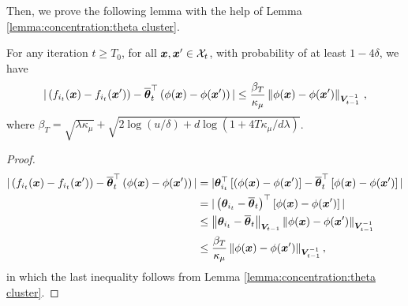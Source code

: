 Then, we prove the following lemma with the help of Lemma \ref{lemma:concentration:theta cluster}.
\begin{lemma}
    \label{lemma:ucb:diff}
For any iteration $t\geq T_0$, for all $\boldsymbol{x},\boldsymbol{x}'\in\mathcal{X}_t$, with probability of at least $1-4\delta$, we have 
\[
|\left(f_{i_t}(\boldsymbol{x}) - f_{i_t}(\boldsymbol{x}')\right) - \overline{\boldsymbol{\theta}}_t^{\top}\left( \phi(\boldsymbol{x}) - \phi(\boldsymbol{x}') \right)| \leq \frac{\beta_T}{\kappa_\mu}\left\| \phi(\boldsymbol{x}) - \phi(\boldsymbol{x}') \right\|_{\boldsymbol{V}_{t-1}^{-1}}\,,
\]
where $\beta_T=\sqrt{\lambda \kappa_\mu}+\sqrt{2\log(u/\delta)+d\log(1+4T\kappa_\mu/d\lambda)}$.
\end{lemma}
\begin{proof}
\begin{equation}
\begin{split}
|\left(f_{i_t}(\boldsymbol{x}) - f_{i_t}(\boldsymbol{x}')\right) - \overline{\boldsymbol{\theta}}_t^{\top}\left( \phi(\boldsymbol{x}) - \phi(\boldsymbol{x}') \right)| &= |\boldsymbol{\theta}_{i_t}^{\top} \left[(\phi(\boldsymbol{x}) - \phi(\boldsymbol{x}')\right] - \overline{\boldsymbol{\theta}}_t^{\top}\left[ \phi(\boldsymbol{x}) - \phi(\boldsymbol{x}') \right]|\\
&= | \left(\boldsymbol{\theta}_{i_t} - \overline{\boldsymbol{\theta}}_t\right)^{\top} \left[\phi(\boldsymbol{x}) - \phi(\boldsymbol{x}') \right]|\\
&\leq \left\| \boldsymbol{\theta}_{i_t} - \overline{\boldsymbol{\theta}}_t \right\|_{\boldsymbol{V}_{t-1}} \left\| \phi(\boldsymbol{x}) - \phi(\boldsymbol{x}') \right\|_{\boldsymbol{V}_{t-1}^{-1}}\\
&\leq \frac{\beta_T}{\kappa_\mu} \left\| \phi(\boldsymbol{x}) - \phi(\boldsymbol{x}') \right\|_{\boldsymbol{V}_{t-1}^{-1}},
\end{split}
\end{equation}
in which the last inequality follows from Lemma \ref{lemma:concentration:theta cluster}.
\end{proof}

